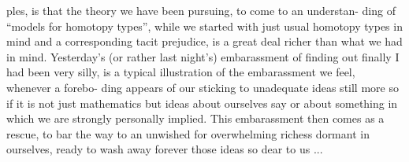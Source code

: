 ples, is that the theory we have been pursuing, to come to an understan-%
ding of ``models for homotopy types'', while we started with just usual
homotopy types in mind and a corresponding tacit prejudice, is a great
deal richer than what we had in mind. Yesterday's (or rather last
night's) embarassment of finding out finally I had been very silly, is
a typical illustration of the embarassment we feel, whenever a forebo-%
ding appears of our sticking to unadequate ideas\over{,}{;} still more so if it is
not just mathematics but ideas about ourselves say or about something
in which we are strongly personally implied. This embarassment then
comes as a rescue, to bar the way to an unwished for overwhelming
richess dormant in ourselves,  ready to wash away forever those ideas
so dear to us ...


